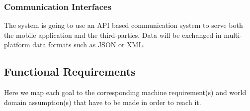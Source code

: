 \documentclass{article}
\begin{document}
	\subsubsection{Communication Interfaces}
	The system is going to use an API based communication system to 
	serve both the mobile application and the third-parties. \newline
	Data will be exchanged in multi-platform data formats such as 
	JSON or XML.
		
\newpage
\subsection{Functional Requirements}	

Here we map each goal to the corresponding machine requirement(s) and 
world domain assumption(s) that have to be made in order to reach it.
\end{document}
